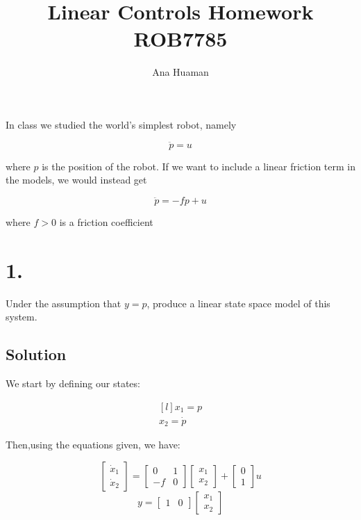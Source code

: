 \documentclass[10pt,a4paper]{article}
\author{Ana Huaman}
\title{\textbf{Linear Controls Homework} \\ ROB7785}
\date{}
\begin{document}
\maketitle

In class we studied the world's simplest robot, namely

\[ \ddot{p} = u \]

where $p$ is the position of the robot. If we want to include a linear friction term in the models, we would instead get

\[ \ddot{p} = -fp + u \]

where $f > 0$ is a friction coefficient

\section*{1.}
Under the assumption that $y = p$, produce a linear state space model of this system.

\subsection*{Solution}
We start by defining our states:

\[ 
\begin{matrix*}[l]
x_{1} = p \\
x_{2} = \dot{p}
\end{matrix*} 
\]

Then,using the equations given, we have:

\[
\begin{bmatrix}
\dot{x}_{1} \\
\dot{x}_{2}
\end{bmatrix}
=
\begin{bmatrix}
0 & 1 \\
-f & 0
\end{bmatrix}
\begin{bmatrix}
x_{1} \\
x_{2}
\end{bmatrix}
+
\begin{bmatrix}
0 \\
1
\end{bmatrix}
u
\]
\[ y = 
\begin{bmatrix}
1 & 0
\end{bmatrix}
\begin{bmatrix}
x_{1} \\
x_{2}
\end{bmatrix}
\]
\end{document}

